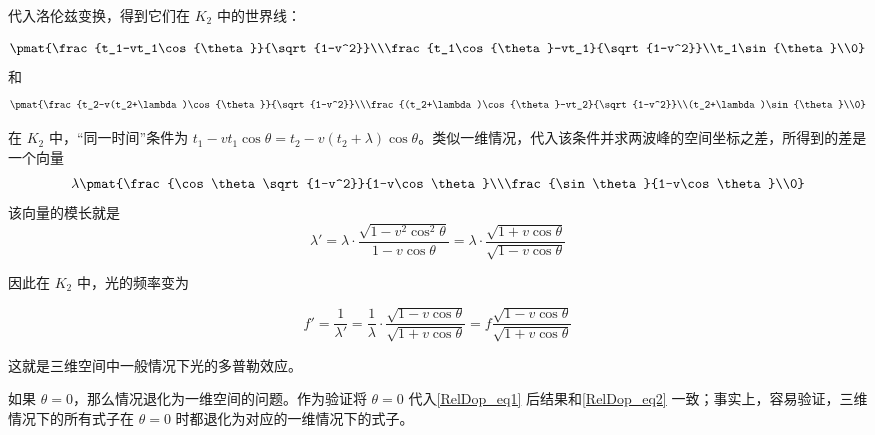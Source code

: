 代入洛伦兹变换，得到它们在 $K_2$ 中的世界线：

\begin{equation}
\pmat{\frac{t_1-vt_1\cos{\theta}}{\sqrt{1-v^2}}\\\frac{t_1\cos{\theta}-vt_1}{\sqrt{1-v^2}}\\t_1\sin{\theta}\\0}
\end{equation}
和
\begin{equation}
\pmat{\frac{t_2-v(t_2+\lambda)\cos{\theta}}{\sqrt{1-v^2}}\\\frac{(t_2+\lambda)\cos{\theta}-vt_2}{\sqrt{1-v^2}}\\(t_2+\lambda)\sin{\theta}\\0}
\end{equation}

在 $K_2$ 中，“同一时间”条件为 $t_1-vt_1\cos{\theta}=t_2-v(t_2+\lambda)\cos{\theta}$。类似一维情况，代入该条件并求两波峰的空间坐标之差，所得到的差是一个向量
\begin{equation}
\lambda\pmat{\frac{\cos\theta\sqrt{1-v^2}}{1-v\cos\theta}\\\frac{\sin\theta}{1-v\cos\theta}\\0}
\end{equation}
该向量的模长就是
\begin{equation}
\lambda'=\lambda\cdot\frac{\sqrt{1-v^2\cos^2\theta}}{1-v\cos\theta} = \lambda\cdot\frac{\sqrt{1+v\cos\theta}}{\sqrt{1-v\cos\theta}}
\end{equation}

因此在 $K_2$ 中，光的频率变为

\begin{equation}\label{RelDop_eq1}
f'=\frac{1}{\lambda'}=\frac{1}{\lambda}\cdot\frac{\sqrt{1-v\cos\theta}}{\sqrt{1+v\cos\theta}}=f\frac{\sqrt{1-v\cos\theta}}{\sqrt{1+v\cos\theta}}
\end{equation}

这就是三维空间中一般情况下光的多普勒效应。

如果 $\theta=0$，那么情况退化为一维空间的问题。作为验证将 $\theta=0$ 代入\autoref{RelDop_eq1} 后结果和\autoref{RelDop_eq2} 一致；事实上，容易验证，三维情况下的所有式子在 $\theta=0$ 时都退化为对应的一维情况下的式子。

